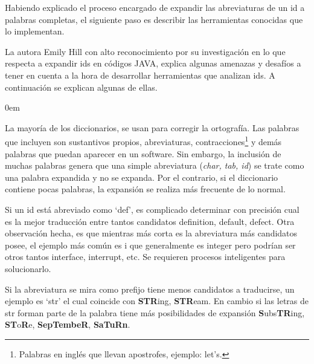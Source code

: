 Habiendo explicado el proceso encargado de expandir las abreviaturas de un id a palabras completas, el siguiente paso es describir las herramientas conocidas que lo implementan. 

La autora Emily Hill \cite{EZH08} con alto reconocimiento por su investigación en lo que respecta a expandir ids en códigos JAVA, explica algunas amenazas y desafíos a tener en cuenta a la hora de desarrollar herramientas que analizan ids. A continuación se explican algunas de ellas.

\begin{description}
\itemsep0em%
\item[Dificultad para armar diccionarios apropiados:]  La mayoría de los diccionarios, se usan para corregir la ortografía. Las palabras que incluyen son sustantivos propios, abreviaturas, contracciones\footnote[1]{Palabras en inglés que llevan apostrofes, ejemplo: let's.} y demás palabras que puedan aparecer en un software. Sin embargo, la inclusión de muchas palabras genera que una simple abreviatura (\textit{char, tab, id}) se trate como una palabra expandida y no se expanda. Por el contrario, si el diccionario contiene pocas palabras, la expansión se realiza más frecuente de lo normal.

\item[Dificultad para traducir abreviaturas cortas:] Si un id está 
abreviado como `\textsf{def}', es complicado determinar con precisión cual es la mejor traducción entre tantos candidatos \textsf{definition, default, defect}. Otra observación hecha, es que mientras más corta es la abreviatura más candidatos posee, el ejemplo más común es \textsf{i} que generalmente es \textsf{integer} pero podrían ser otros tantos \textsf{interface, interrupt}, etc. Se requieren procesos inteligentes para solucionarlo.

\item[Distintas políticas de expansión:] Si la abreviatura se mira como prefijo tiene menos candidatos a traducirse, un ejemplo es `\textsf{str}' el cual coincide con \textbf{STR}\textsf{ing}, \textbf{STR}\textsf{eam}. En cambio si las letras de \textsf{str} forman parte de la palabra tiene más posibilidades de expansión \textbf{S}\textsf{ubs}\textbf{TR}\textsf{ing}, \textbf{ST}\textsf{o}\textbf{R}\textsf{e}, \textbf{S}\textbf{ep}\textbf{T}\textbf{embe}\textbf{R}, \textbf{S}\textbf{a}\textbf{T}\textbf{u}\textbf{R}\textbf{n}.
\end{description}

